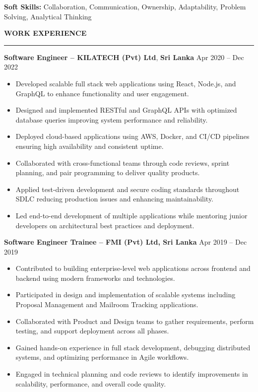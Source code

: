 \documentclass[10pt,letterpaper]{article}
\begin{document}
\textbf{Soft Skills:} Collaboration, Communication, Ownership, Adaptability, Problem Solving, Analytical Thinking

\vspace{8pt}

\textbf{WORK EXPERIENCE}\\[-8pt]
\noindent\rule{\textwidth}{1pt}

\vspace{-2pt}

\textbf{Software Engineer -- KILATECH (Pvt) Ltd}, \textbf{Sri Lanka} \hfill Apr 2020 -- Dec 2022

\vspace{-1pt}

\begin{itemize}
\item Developed scalable full stack web applications using React, Node.js, and GraphQL to enhance functionality and user engagement.
\item Designed and implemented RESTful and GraphQL APIs with optimized database queries improving system performance and reliability.
\item Deployed cloud-based applications using AWS, Docker, and CI/CD pipelines ensuring high availability and consistent uptime.
\item Collaborated with cross-functional teams through code reviews, sprint planning, and pair programming to deliver quality products.
\item Applied test-driven development and secure coding standards throughout SDLC reducing production issues and enhancing maintainability.
\item Led end-to-end development of multiple applications while mentoring junior developers on architectural best practices and deployment.
\end{itemize}

\textbf{Software Engineer Trainee -- FMI (Pvt) Ltd, Sri Lanka} \hfill Apr 2019 -- Dec 2019

\vspace{-1pt}

\begin{itemize}
\item Contributed to building enterprise-level web applications across frontend and backend using modern frameworks and technologies.
\item Participated in design and implementation of scalable systems including Proposal Management and Mailroom Tracking applications.
\item Collaborated with Product and Design teams to gather requirements, perform testing, and support deployment across all phases.
\item Gained hands-on experience in full stack development, debugging distributed systems, and optimizing performance in Agile workflows.
\item Engaged in technical planning and code reviews to identify improvements in scalability, performance, and overall code quality.
\end{itemize}
\end{document}
